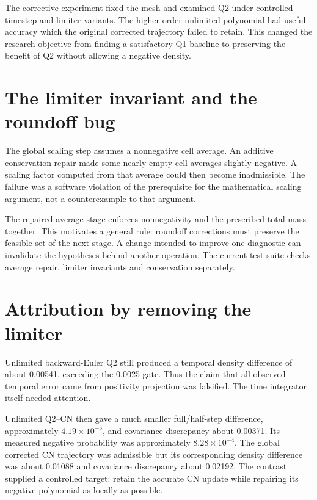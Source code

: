The corrective experiment fixed the mesh and examined Q2 under controlled timestep and limiter variants. The higher-order unlimited polynomial had useful accuracy which the original corrected trajectory failed to retain. This changed the research objective from finding a satisfactory Q1 baseline to preserving the benefit of Q2 without allowing a negative density.


\section{The limiter invariant and the roundoff bug}
The global scaling step assumes a nonnegative cell average. An additive conservation repair made some nearly empty cell averages slightly negative. A scaling factor computed from that average could then become inadmissible. The failure was a software violation of the prerequisite for the mathematical scaling argument, not a counterexample to that argument.

The repaired average stage enforces nonnegativity and the prescribed total mass together. This motivates a general rule: roundoff corrections must preserve the feasible set of the next stage. A change intended to improve one diagnostic can invalidate the hypotheses behind another operation. The current test suite checks average repair, limiter invariants and conservation separately.

\section{Attribution by removing the limiter}
Unlimited backward-Euler Q2 still produced a temporal density difference of about 0.00541, exceeding the 0.0025 gate. Thus the claim that all observed temporal error came from positivity projection was falsified. The time integrator itself needed attention.

Unlimited Q2--CN then gave a much smaller full/half-step difference, approximately $4.19\times10^{-5}$, and covariance discrepancy about 0.00371. Its measured negative probability was approximately $8.28\times10^{-4}$. The global corrected CN trajectory was admissible but its corresponding density difference was about 0.01088 and covariance discrepancy about 0.02192. The contrast supplied a controlled target: retain the accurate CN update while repairing its negative polynomial as locally as possible.

